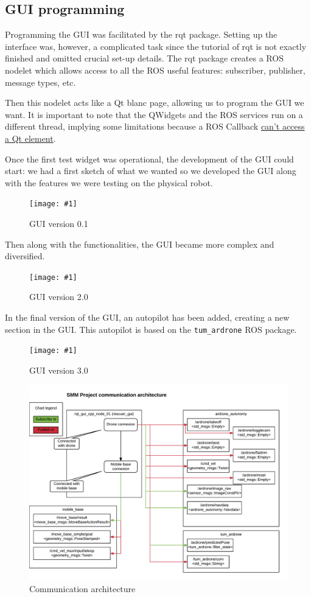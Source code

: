 \documentclass[11pt,a4paper]{article}
\newcommand{\centerFigure}[2]{
\begin{figure}[ht]	
\centering
\texttt{[image: \#1]}
\caption{#2}
\end{figure}
}
\begin{document}
\subsection{GUI programming}
Programming the GUI was facilitated by the rqt package. Setting up the interface was, however,
 a complicated task since the tutorial of rqt is not exactly finished and omitted crucial set-up details. The rqt package creates a ROS nodelet which allows access to
all the ROS useful features: subscriber, publisher, message types, etc.

Then this nodelet acts like a Qt blanc page, allowing us to program the GUI we want. It is 
important to note that the QWidgets and the ROS services run on a different thread, implying some limitations because a ROS Callback
\href{http://wiki.ros.org/rqt/Tutorials/Writing\%20a\%20C\%2B\%2B\%20Plugin}
{can't access a Qt element}.

Once the first test widget was operational, the development of the GUI could start: we had a 
first sketch of what we wanted so we developed the GUI along with the features we were
testing on the physical robot.
\centerFigure{guiSketch.png}{GUI version 0.1}

Then along with the functionalities, the GUI became more complex and diversified.
\centerFigure{guiV2.png}{GUI version 2.0}

In the final version of the GUI, an autopilot has been added, creating a new section in the 
GUI. This autopilot is based on the \verb!tum_ardrone! ROS package.
\centerFigure{guiV3.png}{GUI version 3.0}

\begin{figure}[ht]	
\centering
\includegraphics[width=14cm]{communicationArchitecture.png}
\caption{Communication architecture}
\end{figure}
\end{document}
